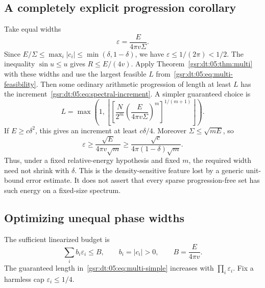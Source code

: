 \documentclass[11pt,letterpaper]{article}
\numberwithin{equation}{section}
\theoremstyle{definition}
\theoremstyle{remark}
\newcommand{\1}{\mathbf 1}
\newcommand{\eps}{\varepsilon}
\begin{document}
\subsection{A completely explicit progression corollary}
Take equal widths
\begin{equation}
 \eps=\frac{E}{4\pi v\Sigma}.
 \label{gsr:dt:05:eq:equal-spectral-width}
\end{equation}
Since $E/\Sigma\leq\max_i|c_i|\leq\min(\delta,1-\delta)$, we have $\eps\leq1/(2\pi)<1/2$. The inequality $\sin u\leq u$ gives $R\leq E/(4v)$. Apply Theorem~\ref{gsr:dt:05:thm:multi} with these widths and use the largest feasible $L$ from~\eqref{gsr:dt:05:eq:multi-feasibility}. Then some ordinary arithmetic progression of length at least $L$ has the increment~\eqref{gsr:dt:05:eq:spectral-increment}. A simpler guaranteed choice is
\begin{equation}
 L=\max\left(1,\left\lfloor
 \left[\frac N{2^m}\left(\frac{E}{4\pi v\Sigma}\right)^m\right]^{1/(m+1)}
 \right\rfloor\right).
 \label{gsr:dt:05:eq:spectral-length}
\end{equation}
If $E\geq c\delta^2$, this gives an increment at least $c\delta/4$. Moreover $\Sigma\leq\sqrt{mE}$, so
\[
 \eps\geq\frac{\sqrt E}{4\pi v\sqrt m}
 \geq\frac{\sqrt c}{4\pi(1-\delta)\sqrt m}.
\]
Thus, under a fixed relative-energy hypothesis and fixed $m$, the required width need not shrink with $\delta$. This is the density-sensitive feature lost by a generic unit-bound error estimate. It does not assert that every sparse progression-free set has such energy on a fixed-size spectrum.

\subsection{Optimizing unequal phase widths}
The sufficient linearized budget is
\begin{equation}
 \sum_i b_i\eps_i\leq B,
 \qquad b_i=|c_i|>0,
 \qquad B=\frac{E}{4\pi v}.
 \label{gsr:dt:05:eq:width-budget}
\end{equation}
The guaranteed length in~\eqref{gsr:dt:05:eq:multi-simple} increases with $\prod_i\eps_i$. Fix a harmless cap $\eps_i\leq1/4$.
\end{document}
